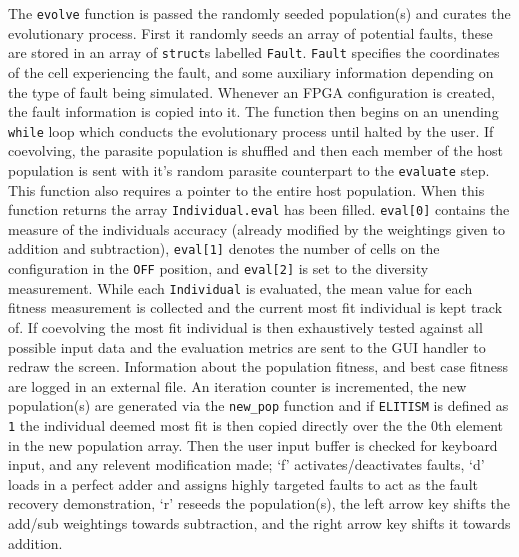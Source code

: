 The \texttt{evolve} function is passed the randomly seeded population(s) and
curates the evolutionary process. First it randomly seeds an array of potential
faults, these are stored in an array of \texttt{struct}s labelled \texttt{Fault}.
\texttt{Fault} specifies the coordinates of the cell experiencing the fault,
and some auxiliary information depending on the type of fault being simulated.
Whenever an FPGA configuration is created, the fault information is copied into it.
The function then begins on an unending \texttt{while} loop which conducts
the evolutionary process until halted by the user. If coevolving, the parasite
population is shuffled and then each member of the host population is sent
with it's random parasite counterpart to the \texttt{evaluate} step. This function
also requires a pointer to the entire host population.
When this
function returns the array \texttt{Individual.eval} has been filled. \texttt{eval[0]}
contains the measure of the individuals accuracy (already modified by the
weightings given to addition and subtraction), \texttt{eval[1]} denotes the number
of cells on the configuration in the \texttt{OFF} position, and \texttt{eval[2]}
is set to the diversity measurement. While each \texttt{Individual} is
evaluated, the mean value for each fitness measurement is collected and the current
most fit individual is kept track of. If coevolving the most fit individual is then
exhaustively tested against all possible input data and the evaluation metrics
are sent to the GUI handler to redraw
the screen. Information about the population fitness, and best case fitness are
logged in an external file. An iteration counter is incremented, the new population(s)
are generated via the \texttt{new\_pop} function and if \texttt{ELITISM}
is defined as \texttt{1} the individual deemed most fit is then copied directly over
the the 0th element in the new population array.
Then the user input buffer is checked for keyboard input, and any relevent
modification made;
`f' activates/deactivates faults, `d' loads in a perfect adder and assigns highly targeted faults
to act as the fault recovery demonstration, `r' reseeds the population(s), the
left arrow key shifts the add/sub weightings towards subtraction, and the right
arrow key shifts it towards addition.

